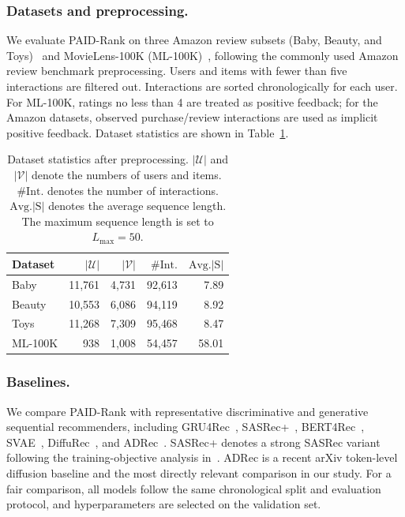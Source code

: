 \documentclass[runningheads,a4paper]{llncs}
\begin{document}
\subsubsection{Datasets and preprocessing.}
We evaluate PAID-Rank on three Amazon review subsets (Baby, Beauty, and Toys)~\cite{he2016amazon} and MovieLens-100K (ML-100K)~\cite{harper2015movielens}, following the commonly used Amazon review benchmark preprocessing. Users and items with fewer than five interactions are filtered out. Interactions are sorted chronologically for each user. For ML-100K, ratings no less than 4 are treated as positive feedback; for the Amazon datasets, observed purchase/review interactions are used as implicit positive feedback. Dataset statistics are shown in Table~\ref{tab:dataset_stats}.

\begin{table}[tbp]
    \centering
    \caption{Dataset statistics after preprocessing. $|\mathcal{U}|$ and $|\mathcal{V}|$ denote the numbers of users and items. $\#\mathrm{Int.}$ denotes the number of interactions. $\mathrm{Avg.|S|}$ denotes the average sequence length. The maximum sequence length is set to $L_{\max}=50$.}
    \label{tab:dataset_stats}
    \setlength{\tabcolsep}{4.5pt}
    \begin{tabular}{lrrrr}
        \toprule
        Dataset & $|\mathcal{U}|$ & $|\mathcal{V}|$ & $\#\mathrm{Int.}$ & $\mathrm{Avg.|S|}$ \\
        \midrule
        Baby    & 11{,}761 & 4{,}731 & 92{,}613  & 7.89  \\
        Beauty  & 10{,}553 & 6{,}086 & 94{,}119  & 8.92  \\
        Toys    & 11{,}268 & 7{,}309 & 95{,}468  & 8.47  \\
        ML-100K & 938      & 1{,}008 & 54{,}457  & 58.01 \\
        \bottomrule
    \end{tabular}
\end{table}

\subsubsection{Baselines.}
We compare PAID-Rank with representative discriminative and generative sequential recommenders, including GRU4Rec~\cite{hidasi2016gru4rec}, SASRec+~\cite{kang2018sasrec,klenitskiy2023sasrecplus}, BERT4Rec~\cite{sun2019bert4rec}, SVAE~\cite{sachdeva2019svae}, DiffuRec~\cite{li2023diffurec}, and ADRec~\cite{chen2025adrec}. SASRec+ denotes a strong SASRec variant following the training-objective analysis in~\cite{klenitskiy2023sasrecplus}. ADRec is a recent arXiv token-level diffusion baseline and the most directly relevant comparison in our study. For a fair comparison, all models follow the same chronological split and evaluation protocol, and hyperparameters are selected on the validation set.
\end{document}
